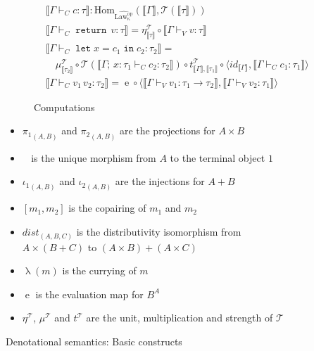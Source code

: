 \documentclass[acmsmall, screen, review, anonymous]{acmart}
\theoremstyle{definition}
\newcommand{\arr}{\rightarrow}
\newcommand{\lawcop}{\mathrm{Law_{\kappa}^{op}}}
\newcommand{\pshlawcop}{\widehat{\lawcop}}
\newcommand{\homset}[3]{\mathrm{Hom}_{#1}(#2, #3)}
\newcommand{\arrow}[2]{{#2}^{#1}}
\newcommand{\sem}[1]{\llbracket #1 \rrbracket}
\newcommand{\unit}[1]{\eta^{#1}}
\newcommand{\mult}[1]{\mu^{#1}}
\newcommand{\strength}[1]{t^{#1}}
\newcommand{\mon}{\mathcal{T}}
\newcommand{\fstc}[2]{{\pi_1}_{(#1, #2)}}
\newcommand{\sndc}[2]{{\pi_2}_{(#1, #2)}}
\newcommand{\bang}[1]{\mathop{!_{#1}}}
\newcommand{\inlc}[2]{{\iota_1}_{(#1, #2)}}
\newcommand{\inrc}[2]{{\iota_2}_{(#1, #2)}}
\newcommand{\copair}[2]{[#1, #2]}
\newcommand{\distc}[3]{\mathit{dist}_{(#1, #2, #3)}}
\newcommand{\types}{\mathrel{:}}
\newcommand{\app}[2]{#1\,#2}
\newcommand{\ccons}[2]{#1;\,#2}
\newcommand{\lbind}[3]{\ccons{#1}{#2\types#3}}
\newcommand{\returnname}{\mathop{\mathtt{return}}}
\newcommand{\return}[1]{\returnname\, #1}
\newcommand{\letvname}{\mathop{\mathtt{let}}}
\newcommand{\letv}[3]{\letvname #1 = #2 \mathop{\mathtt{in}} #3}
\newcommand{\turnv}{\mathrel{\vdash_V}}
\newcommand{\turnc}{\mathrel{\vdash_C}}
\newcommand{\evmap}[2]{\mathop{ev_{(#1, #2)}}}
\newcommand{\currying}[1]{\mathop{\lambda}(#1)}
\begin{document}
\begin{figure}
\begin{subfigure}{\textwidth}
\begin{align*}
&\sem{\Gamma \turnc c \types \tau} \mathrel{:} \homset{\pshlawcop}{\sem{\Gamma}}{\mon(\sem{\tau})} \\
&\sem{\Gamma \turnc \return{v} \types \tau} = \unit{\mon}_{\sem{\tau}} \circ \sem{\Gamma \turnv v \types \tau} \\
&\sem{\Gamma \turnc \letv{x}{c_1}{c_2} \types \tau_2} = {} \\
&\quad \mult{\mon}_{\sem{\tau_2}}
    \circ \mon(\sem{\lbind{\Gamma}{x}{\tau_1} \turnc c_2 \types \tau_2})
    \circ \strength{\mon}_{\sem{\Gamma}, \sem{\tau_1}}
    \circ \langle id_{\sem{\Gamma}}, \sem{\Gamma \turnc c_1 \types \tau_1} \rangle \\
&\sem{\Gamma \turnc \app{v_1}{v_2} \types \tau_2} =
    \evmap{\sem{\tau_1}}{\mon(\sem{\tau_2})}
    \circ \langle \sem{\Gamma \turnv v_1 \types \tau_1 \arr \tau_2},
                  \sem{\Gamma \turnv v_2 \types \tau_1} \rangle
\end{align*}
\caption{Computations}
\end{subfigure}

\begin{itemize}
\item $\fstc{A}{B}$ and $\sndc{A}{B}$ are the projections for $A \times B$
\item $\bang{A}$ is the unique morphism from $A$ to the terminal object $1$
\item $\inlc{A}{B}$ and $\inrc{A}{B}$ are the injections for $A + B$
\item $\copair{m_1}{m_2}$ is the copairing of $m_1$ and $m_2$
\item $\distc{A}{B}{C}$ is the distributivity isomorphism from
  $A \times (B + C)$ to $(A \times B) + (A \times C)$
\item $\currying{m}$ is the currying of $m$
\item $\evmap{A}{B}$ is the evaluation map for $\arrow{A}{B}$
\item $\unit{\mon}$, $\mult{\mon}$ and $\strength{\mon}$ are the unit,
  multiplication and strength of $\mon$
\end{itemize}
\caption{Denotational semantics: Basic constructs}
\label{fig:denotational-standard}
\end{figure}
\end{document}
